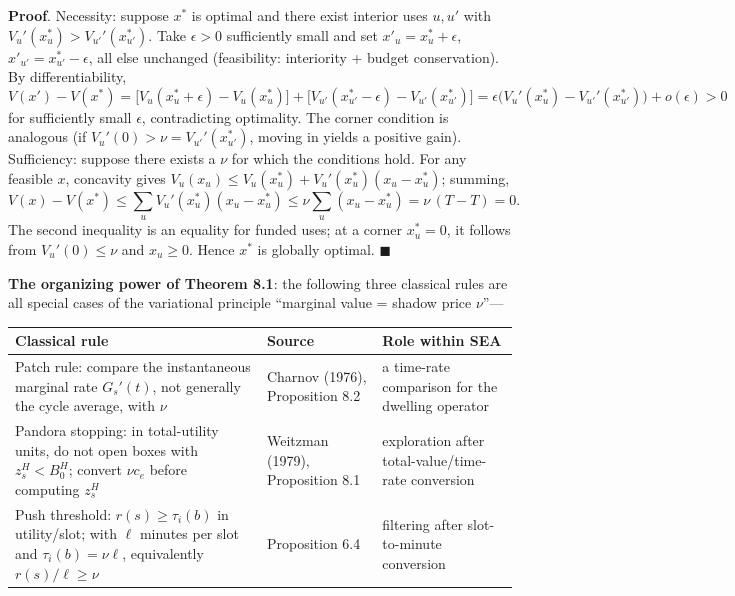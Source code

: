 \documentclass[
  11pt]{article}
\begin{document}
\textbf{Proof}. Necessity: suppose \(x^*\) is optimal and there exist
interior uses \(u, u'\) with \(V_u'(x_u^*) > V_{u'}'(x_{u'}^*)\). Take
\(\epsilon > 0\) sufficiently small and set \(x'_u = x_u^* + \epsilon\),
\(x'_{u'} = x_{u'}^* - \epsilon\), all else unchanged (feasibility:
interiority + budget conservation). By differentiability,
\[V(x') - V(x^*) = \big[V_u(x_u^*+\epsilon) - V_u(x_u^*)\big] + \big[V_{u'}(x_{u'}^*-\epsilon) - V_{u'}(x_{u'}^*)\big] = \epsilon\big(V_u'(x_u^*) - V_{u'}'(x_{u'}^*)\big) + o(\epsilon) > 0\]
for sufficiently small \(\epsilon\), contradicting optimality. The
corner condition is analogous (if \(V_u'(0) > \nu = V_{u'}'(x_{u'}^*)\),
moving in yields a positive gain). Sufficiency: suppose there exists a
\(\nu\) for which the conditions hold. For any feasible \(x\), concavity
gives \(V_u(x_u) \le V_u(x_u^*) + V_u'(x_u^*)(x_u - x_u^*)\); summing,
\[V(x) - V(x^*) \le \sum_u V_u'(x_u^*)(x_u - x_u^*) \le \nu \sum_u (x_u - x_u^*) = \nu\,(T - T) = 0.\]
The second inequality is an equality for funded uses; at a corner
\(x_u^*=0\), it follows from \(V_u'(0)\le\nu\) and \(x_u\ge0\). Hence
\(x^*\) is globally optimal. \(\blacksquare\)

\textbf{The organizing power of Theorem 8.1}: the following three
classical rules are all special cases of the variational principle
``marginal value = shadow price \(\nu\)''---

\begin{longtable}[]{@{}
  >{\raggedright\arraybackslash}p{}
  >{\raggedright\arraybackslash}p{}
  >{\raggedright\arraybackslash}p{}@{}}
\toprule\noalign{}
\begin{minipage}[b]{\linewidth}\raggedright
Classical rule
\end{minipage} & \begin{minipage}[b]{\linewidth}\raggedright
Source
\end{minipage} & \begin{minipage}[b]{\linewidth}\raggedright
Role within SEA
\end{minipage} \\
\midrule\noalign{}
\endhead
\bottomrule\noalign{}
\endlastfoot
Patch rule: compare the instantaneous marginal rate \(G_s'(t)\), not
generally the cycle average, with \(\nu\) & Charnov (1976), Proposition
8.2 & a time-rate comparison for the dwelling operator \\
Pandora stopping: in total-utility units, do not open boxes with
\(z_s^H<B_0^H\); convert \(\nu c_e\) before computing \(z_s^H\) &
Weitzman (1979), Proposition 8.1 & exploration after
total-value/time-rate conversion \\
Push threshold: \(r(s)\ge\tau_i(b)\) in utility/slot; with \(\ell\)
minutes per slot and \(\tau_i(b)=\nu\ell\), equivalently
\(r(s)/\ell\ge\nu\) & Proposition 6.4 & filtering after slot-to-minute
conversion \\
\end{longtable}
\end{document}
